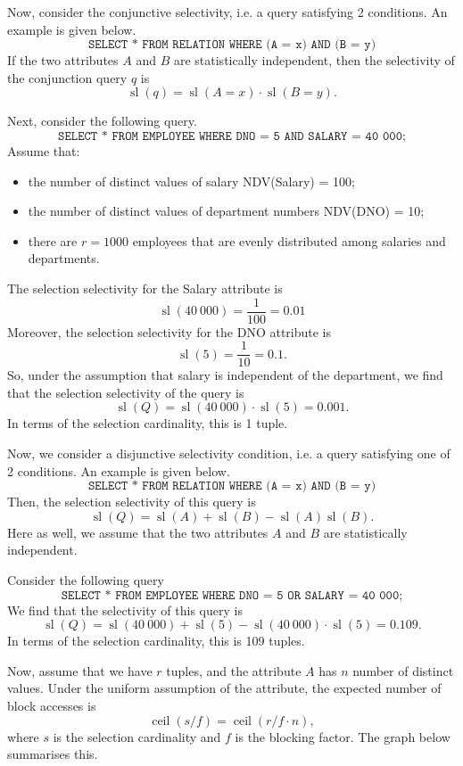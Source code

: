 \documentclass[a4paper, openany]{memoir}
\theoremstyle{definition}
\theoremstyle{plain}
\begin{document}
Now, consider the conjunctive selectivity, i.e. a query satisfying 2 conditions. An example is given below.
\[\texttt{SELECT * FROM RELATION WHERE (A = x) AND (B = y)}\]
If the two attributes $A$ and $B$ are statistically independent, then the selectivity of the conjunction query $q$ is
\[\operatorname{sl}(q) = \operatorname{sl}(A = x) \cdot \operatorname{sl}(B = y).\]

Next, consider the following query.
\[\texttt{SELECT * FROM EMPLOYEE WHERE DNO = 5 AND SALARY = 40 000;}\]
Assume that:
\begin{itemize}
    \item the number of distinct values of salary NDV(Salary) = 100;
    \item the number of distinct values of department numbers NDV(DNO) = 10;
    \item there are $r = 1000$ employees that are evenly distributed among salaries and departments.
\end{itemize}
The selection selectivity for the Salary attribute is
\[\operatorname{sl}(40 \ 000) = \frac{1}{100} = 0.01\]
Moreover, the selection selectivity for the DNO attribute is
\[\operatorname{sl}(5) = \frac{1}{10} = 0.1.\]
So, under the assumption that salary is independent of the department, we find that the selection selectivity of the query is
\[\operatorname{sl}(Q) = \operatorname{sl}(40 \ 000) \cdot \operatorname{sl}(5) = 0.001.\]
In terms of the selection cardinality, this is 1 tuple.

Now, we consider a disjunctive selectivity condition, i.e. a query satisfying one of 2 conditions. An example is given below.
\[\texttt{SELECT * FROM RELATION WHERE (A = x) AND (B = y)}\]
Then, the selection selectivity of this query is
\[\operatorname{sl}(Q) = \operatorname{sl}(A) + \operatorname{sl}(B) - \operatorname{sl}(A) \operatorname{sl}(B).\]
Here as well, we assume that the two attributes $A$ and $B$ are statistically independent.

Consider the following query
\[\texttt{SELECT * FROM EMPLOYEE WHERE DNO = 5 OR SALARY = 40 000;}\]
We find that the selectivity of this query is
\[\operatorname{sl}(Q) = \operatorname{sl}(40 \ 000) + \operatorname{sl}(5) - \operatorname{sl}(40 \ 000) \cdot \operatorname{sl}(5) = 0.109.\]
In terms of the selection cardinality, this is 109 tuples.

Now, assume that we have $r$ tuples, and the attribute $A$ has $n$ number of distinct values. Under the uniform assumption of the attribute, the expected number of block accesses is
\[\operatorname{ceil}(s/f) = \operatorname{ceil}(r/f \cdot n),\]
where $s$ is the selection cardinality and $f$ is the blocking factor. The graph below summarises this.
\end{document}
